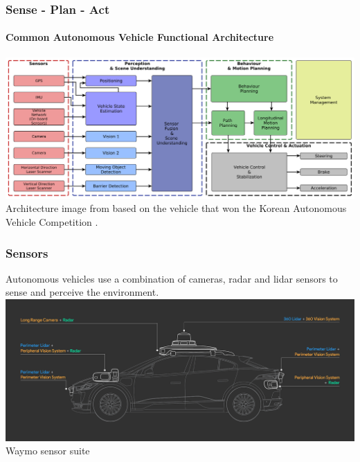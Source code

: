 \begin{frame}
\frametitle{Sense - Plan - Act}
\framesubtitle{Common Autonomous Vehicle Functional Architecture}
\includegraphics[width=\textwidth]{images/tas_2016_fig4_av_functional_architecture.png}
\tiny{Architecture image from \cite{Tas2016-sd} based on the vehicle that won the
Korean Autonomous Vehicle Competition \cite{Jo2014-na}}.
\end{frame}

\begin{frame}
\frametitle{Sensors}
Autonomous vehicles use a combination of cameras, radar and lidar sensors to
sense and perceive the environment. \\
\vspace{0.5cm}
\includegraphics[width=\textwidth]{images/waymo_sensors.png}
\footnotesize{Waymo sensor suite\footnotemark[1]}
\end{frame}

